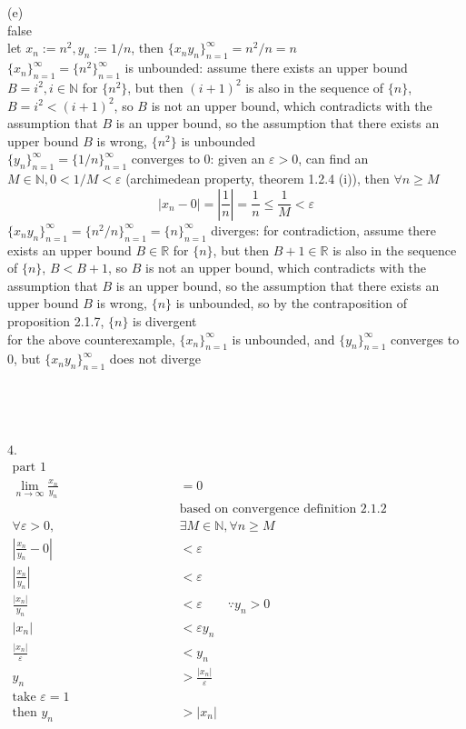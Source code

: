 \documentclass[12pt, border = 4pt, multi]{article} %
\begin{document}
\\
\\
(e)\\
false\\
let $x_n := n ^ 2, y_n := 1 / n$, then $\{x_n y_n\}_{n = 1} ^ {\infty} = n ^ 2 / n = n$\\
$\{x_n\}_{n = 1} ^ {\infty} = \{n ^ 2\}_{n = 1} ^ {\infty}$ is unbounded: assume there exists an upper bound $B = i ^ 2, i \in \mathbb{N}$ for $\{n ^ 2\}$, but then $(i + 1) ^ 2$ is also in the sequence of $\{n\}$, $B = i ^ 2 < (i + 1) ^ 2$, so $B$ is not an upper bound, which contradicts with the assumption that $B$ is an upper bound, so the assumption that there exists an upper bound $B$ is wrong, $\{n ^ 2\}$ is unbounded\\
$\{y_n\}_{n = 1} ^ {\infty} = \{1 / n\}_{n = 1} ^ {\infty}$ converges to 0: given an $\varepsilon > 0$, can find an $M \in \mathbb{N}, 0 < 1 / M < \varepsilon$ (archimedean property, theorem 1.2.4 (i)), then $\forall n \geq M$
\[|x_n - 0| = \left|\frac{1}{n}\right| = \frac{1}{n} \leq \frac{1}{M} < \varepsilon\]
$\{x_n y_n\}_{n = 1} ^ {\infty} = \{n ^ 2 / n\}_{n = 1} ^ {\infty} = \{n\}_{n = 1} ^ {\infty}$ diverges: for contradiction, assume there exists an upper bound $B \in \mathbb{R}$ for $\{n\}$, but then $B + 1 \in \mathbb{R}$ is also in the sequence of $\{n\}$, $B < B + 1$, so $B$ is not an upper bound, which contradicts with the assumption that $B$ is an upper bound, so the assumption that there exists an upper bound $B$ is wrong, $\{n\}$ is unbounded, so by the contraposition of proposition 2.1.7, $\{n\}$ is divergent\\
for the above counterexample, $\{x_n\}_{n = 1} ^ {\infty}$ is unbounded, and $\{y_n\}_{n = 1} ^ {\infty}$ converges to 0, but $\{x_n y_n\}_{n = 1} ^ {\infty}$ does not diverge\\
\\
\\
\\
\\
4.
\begin{align*}
\text{part 1} \hspace{10em}&\\
\lim_{n \rightarrow \infty} \frac{x_n}{y_n} &= 0 \hspace{10em}\\
&\text{based on convergence definition 2.1.2} \hspace{10em}\\
\forall \varepsilon > 0, &\exists M \in \mathbb{N}, \forall n \geq M\\
\left|\frac{x_n}{y_n} - 0\right| &< \varepsilon\\
\left|\frac{x_n}{y_n}\right| &< \varepsilon\\
\frac{|x_n|}{y_n} &< \varepsilon \qquad \because y_n > 0\\
|x_n| &< \varepsilon y_n\\
\frac{|x_n|}{\varepsilon} &< y_n\\
y_n &> \frac{|x_n|}{\varepsilon}\\
\text{take } \varepsilon = 1\\
\text{then } y_n &> |x_n|\\
\end{align*}
\end{document}

